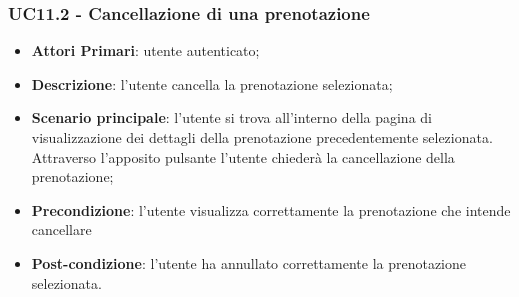 \subsubsection{UC11.2 - Cancellazione di una prenotazione}
\begin{itemize}
	\item \textbf{Attori Primari}: utente autenticato;
	\item \textbf{Descrizione}: l'utente cancella la prenotazione selezionata;
	\item \textbf{Scenario principale}: l'utente si trova all'interno della pagina di visualizzazione dei dettagli della prenotazione precedentemente selezionata. Attraverso l'apposito pulsante l'utente chiederà la cancellazione della prenotazione;
	\item \textbf{Precondizione}: l'utente visualizza correttamente la prenotazione che intende cancellare
	\item \textbf{Post-condizione}: l'utente ha annullato correttamente la prenotazione selezionata.
\end{itemize}
